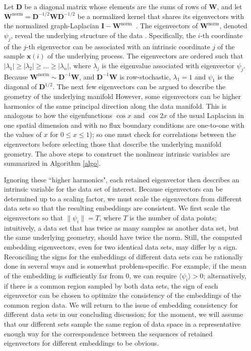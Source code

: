 \documentclass[aip,jcp,preprint]{revtex4-1}
\begin{document}
Let $\mathbf{D}$ be a diagonal matrix whose elements are the sums of rows of $\mathbf{W}$, and let $\mathbf{W}^{\mathrm{norm}} = \mathbf{D}^{-1/2}\mathbf{W}\mathbf{D}^{-1/2}$
be a normalized kernel that shares its eigenvectors with the normalized graph-Laplacian $\mathbf{I}-\mathbf{W}^{\mathrm{norm}} \:$ \cite{chung1997spectral}.
%
The eigenvectors of $\mathbf{W}^{\mathrm{norm}}$, denoted $\psi_j$, reveal the underlying structure of the data \cite{coifman2005geometric}.
%
Specifically, the $i$-th coordinate of the $j$-th eigenvector can be associated with an intrinsic coordinate $j$ of the sample $\mathbf{x}(i)$ of the underlying process.
%
The eigenvectors are ordered such that $|\lambda_1| \ge |\lambda_2| \ge \dots \ge |\lambda_n|$, where $\lambda_j$ is the eigenvalue associated with eigenvector $\psi_j$.
%
Because $\mathbf{W}^{\mathrm{norm}} \sim \mathbf{D}^{-1}\mathbf{W} $, and $\mathbf{D}^{-1}\mathbf{W}$ is row-stochastic,
$\lambda_1 = 1$ and $\psi_1$ is the diagonal of $\mathbf{D}^{1/2}$.
%
The next few eigenvectors can be argued to describe the geometry of the underlying manifold \cite{coifman2005geometric}
%
However, some eigenvectors can be higher harmonics of the same principal direction along the data manifold.
This is analogous to how the eigenfunctions $\cos x$ and $\cos 2x$ of the usual Laplacian in one spatial dimension
and with no flux boundary conditions are one-to-one with the values of $x$ for $0 \le x \le 1$);
so one must check for correlations between the eigenvectors before selecting those that describe the underlying manifold geometry.
%
The above steps to construct the nonlinear intrinsic variables are summarized in Algorithm \ref{algo}.

Ignoring these ``higher harmonics", each retained eigenvector then describes an intrinsic variable for the data set of interest.
%
Because eigenvectors can be determined up to a scaling factor,
we must scale the eigenvectors from different data sets so that the resulting embeddings are consistent.
%
We first scale the eigenvectors so that $\|\psi_i\| = T$, where $T$ is the number of data points;
intuitively, a data set that has twice as many samples as another data set, but the same underlying geometry, should have twice the norm.
%
Still, the computed embedding eigenvectors, even for two identical data sets, may differ by a sign.
%
Reconciling the signs for the embeddings of different data sets can be rationally done in several ways and is somewhat problem-specific.
%
For example, if the mean of the embedding is sufficiently far from 0, we can require $\langle \psi_i \rangle > 0$;
alternatively, if there is a common region sampled by both data sets, the sign of each eigenvector can be chosen to optimize the consistency of the embeddings of the common region data.
%
We will return to the issue of embedding consistency for different data sets in our concluding discussion; for the moment,
we will assume that our different sets sample the same region of data space in a representative enough way for the
correspondence between the sequences of retained eigenvectors for different embeddings to be obvious.
\end{document}
